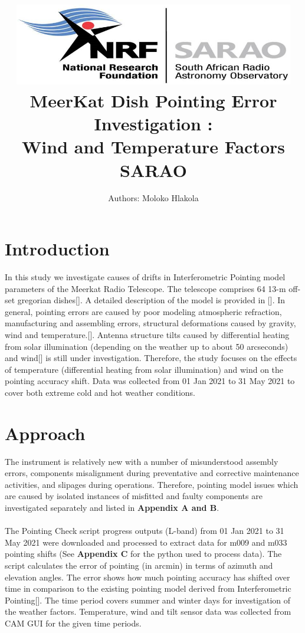 \documentclass{article}
\title{
	{\includegraphics[width=12.3cm]{logo2.png}}\\
	\vspace{1.5cm}
	\vspace{1.5cm}
	{MeerKat Dish Pointing Error Investigation : \\ Wind and Temperature Factors }\\
	{\large SARAO}\\
	\vspace{1.5cm}
}
\author{Authors: Moloko Hlakola}
\date{}
\begin{document}
\maketitle
\clearpage



 \listoffigures
% 



\listoftables 
\tableofcontents

\section{Introduction}
In this study we investigate causes of drifts in Interferometric Pointing model parameters of the Meerkat Radio Telescope. The telescope comprises 64 13-m off-set gregorian dishes[\cite{Tony}].  A detailed description of the model is  provided in [\cite{Tony}]. In general, pointing errors are caused by poor modeling atmospheric refraction, manufacturing and assembling errors, structural deformations caused by gravity, wind and temperature.[\cite{Bayley}].  Antenna structure tilts caused by differential heating from solar illumination (depending on the weather up to
about 50 arcseconds) and wind[\cite{Tony}] is still under investigation. Therefore, the study focuses on the effects of temperature (differential heating from solar illumination) and wind on the pointing accuracy shift.  Data was collected from 01 Jan 2021 to 31 May 2021 to cover both extreme cold and hot weather conditions.  

\section{Approach}

The instrument is relatively new with a number of misunderstood assembly errors, components misalignment during preventative and corrective maintenance activities, and slipages during operations.  Therefore, pointing model issues which are caused by isolated instances of misfitted and faulty components are investigated separately and listed in \textbf{Appendix A and B}.   \\
\\
The Pointing Check script progress outputs (L-band) from 01 Jan 2021 to 31 May 2021 were downloaded and processed to extract data for m009 and m033 pointing shifts (See \textbf{Appendix C} for the python used to process data).  The script calculates the error of pointing (in arcmin) in terms of azimuth and elevation angles.  The error shows how much pointing accuracy has shifted over time in comparison to the existing pointing model derived from Interferometric Pointing[\cite{Tony}].  The time period covers summer and winter days for investigation of the weather factors.  Temperature, wind and tilt sensor data was collected from CAM GUI for the given time periods. \\
\end{document}
